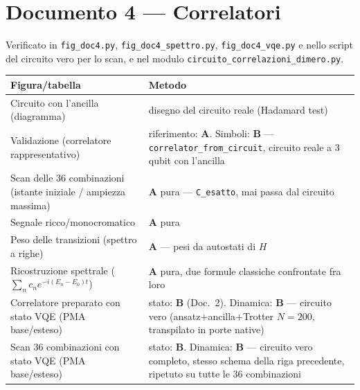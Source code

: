 \documentclass[11pt,a4paper]{article}
\begin{document}
\section{Documento 4 --- Correlatori}

Verificato in \texttt{fig\_doc4.py}, \texttt{fig\_doc4\_spettro.py},
\texttt{fig\_doc4\_vqe.py} e nello script del circuito vero per lo scan, e
nel modulo \texttt{circuito\_correlazioni\_dimero.py}.

\begin{center}
\renewcommand{\arraystretch}{1.3}
\begin{tabular}{@{}p{}p{}@{}}
\toprule
\rowcolor{grigetto}
\textbf{Figura/tabella} & \textbf{Metodo} \\
\midrule
Circuito con l'ancilla (diagramma) & disegno del circuito reale (Hadamard
test) \\
Validazione (correlatore rappresentativo) & riferimento: \textbf{A}. Simboli:
\textbf{B} --- \texttt{correlator\_from\_circuit}, circuito reale a 3 qubit
con l'ancilla \\
Scan delle 36 combinazioni (istante iniziale / ampiezza massima) & \textbf{A}
pura --- \texttt{C\_esatto}, mai passa dal circuito \\
Segnale ricco/monocromatico & \textbf{A} pura \\
Peso delle transizioni (spettro a righe) & \textbf{A} --- pesi da autostati
di $H$ \\
Ricostruzione spettrale ($\sum_n c_n e^{-i(E_n-E_0)t}$) & \textbf{A} pura, due
formule classiche confrontate fra loro \\
Correlatore preparato con stato VQE (PMA base/esteso) & stato: \textbf{B}
(Doc.\ 2). Dinamica: \textbf{B} --- circuito vero (ansatz$+$ancilla$+$Trotter
$N{=}200$, transpilato in porte native) \\
Scan 36 combinazioni con stato VQE (PMA base/esteso) & stato: \textbf{B}.
Dinamica: \textbf{B} --- circuito vero completo, stesso schema della riga
precedente, ripetuto su tutte le $36$ combinazioni \\
\bottomrule
\end{tabular}
\end{center}

\end{document}

